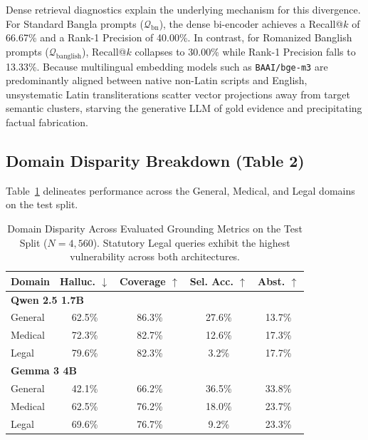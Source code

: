 \documentclass[11pt,a4paper,twocolumn]{article}
\begin{document}
Dense retrieval diagnostics explain the underlying mechanism for this divergence. For Standard Bangla prompts ($\mathcal{Q}_{\text{bn}}$), the dense bi-encoder achieves a Recall@$k$ of 66.67\% and a Rank-1 Precision of 40.00\%. In contrast, for Romanized Banglish prompts ($\mathcal{Q}_{\text{banglish}}$), Recall@$k$ collapses to 30.00\% while Rank-1 Precision falls to 13.33\%. Because multilingual embedding models such as \texttt{BAAI/bge-m3} are predominantly aligned between native non-Latin scripts and English, unsystematic Latin transliterations scatter vector projections away from target semantic clusters, starving the generative LLM of gold evidence and precipitating factual fabrication.

\subsection{Domain Disparity Breakdown (Table 2)}
Table~\ref{tab:domain_disparity} delineates performance across the General, Medical, and Legal domains on the test split.

\begin{table}[t]
\centering
\footnotesize
\setlength{\tabcolsep}{3.5pt}
\begin{tabular}{lcccc}
\toprule
\textbf{Domain} & \textbf{Halluc. $\downarrow$} & \textbf{Coverage $\uparrow$} & \textbf{Sel. Acc. $\uparrow$} & \textbf{Abst. $\uparrow$} \\
\midrule
\multicolumn{5}{l}{\textbf{Qwen 2.5 1.7B}} \\
\quad General & 62.5\% & 86.3\% & 27.6\% & 13.7\% \\
\quad Medical & 72.3\% & 82.7\% & 12.6\% & 17.3\% \\
\quad Legal   & 79.6\% & 82.3\% & \phantom{0}3.2\% & 17.7\% \\
\midrule
\multicolumn{5}{l}{\textbf{Gemma 3 4B}} \\
\quad General & 42.1\% & 66.2\% & 36.5\% & 33.8\% \\
\quad Medical & 62.5\% & 76.2\% & 18.0\% & 23.7\% \\
\quad Legal   & 69.6\% & 76.7\% & \phantom{0}9.2\% & 23.3\% \\
\bottomrule
\end{tabular}
\caption{Domain Disparity Across Evaluated Grounding Metrics on the Test Split ($N=4{,}560$). Statutory Legal queries exhibit the highest vulnerability across both architectures.}
\label{tab:domain_disparity}
\end{table}
\end{document}
